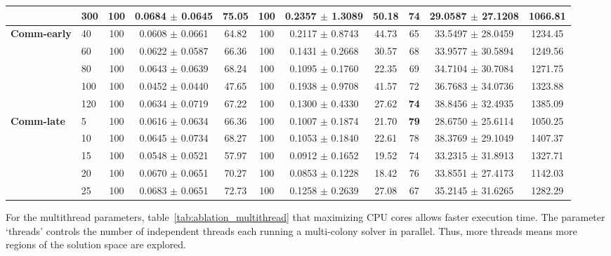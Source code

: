 \begin{table}[H]
{\begin{tabular}{@{}llccc ccc ccc@{}}
        & 300 & 100 & 0.0684 $\pm$ 0.0645 & 75.05 & 100 & 0.2357 $\pm$ 1.3089 & 50.18 & 74 & 29.0587 $\pm$ 27.1208 & 1066.81 \\
        \midrule
        \multirow{5}{*}{\textbf{Comm-early}} 
        & 40  & 100 & 0.0608 $\pm$ 0.0661 & 64.82 & 100 & 0.2117 $\pm$ 0.8743 & 44.73 & 65 & 33.5497 $\pm$ 28.0459 & 1234.45 \\
        & 60  & 100 & 0.0622 $\pm$ 0.0587 & 66.36 & 100 & 0.1431 $\pm$ 0.2668 & 30.57 & 68 & 33.9577 $\pm$ 30.5894 & 1249.56 \\
        & 80  & 100 & 0.0643 $\pm$ 0.0639 & 68.24 & 100 & 0.1095 $\pm$ 0.1760 & 22.35 & 69 & 34.7104 $\pm$ 30.7084 & 1271.75 \\
        & 100 & 100 & 0.0452 $\pm$ 0.0440 & 47.65 & 100 & 0.1938 $\pm$ 0.9708 & 41.57 & 72 & 36.7683 $\pm$ 34.0736 & 1323.88 \\
        & 120 & 100 & 0.0634 $\pm$ 0.0719 & 67.22 & 100 & 0.1300 $\pm$ 0.4330 & 27.62 & \textbf{74} & 38.8456 $\pm$ 32.4935 & 1385.09 \\
        \midrule
        \multirow{5}{*}{\textbf{Comm-late}} 
        & 5   & 100 & 0.0616 $\pm$ 0.0634 & 66.36 & 100 & 0.1007 $\pm$ 0.1874 & 21.70 & \textbf{79} & 28.6750 $\pm$ 25.6114 & 1050.25 \\
        & 10  & 100 & 0.0645 $\pm$ 0.0734 & 68.27 & 100 & 0.1053 $\pm$ 0.1840 & 22.61 & 78 & 38.3769 $\pm$ 29.1049 & 1407.37 \\
        & 15  & 100 & 0.0548 $\pm$ 0.0521 & 57.97 & 100 & 0.0912 $\pm$ 0.1652 & 19.52 & 74 & 33.2315 $\pm$ 31.8913 & 1327.71 \\
        & 20  & 100 & 0.0670 $\pm$ 0.0651 & 70.27 & 100 & 0.0853 $\pm$ 0.1228 & 18.42 & 76 & 33.8551 $\pm$ 27.4173 & 1142.03 \\
        & 25  & 100 & 0.0683 $\pm$ 0.0651 & 72.73 & 100 & 0.1258 $\pm$ 0.2639 & 27.08 & 67 & 35.2145 $\pm$ 31.6265 & 1282.29 \\
        \bottomrule
    \end{tabular}}
\end{table}

For the multithread parameters, table~\ref{tab:ablation_multithread} that maximizing CPU cores allows faster execution time. The parameter `threads' controls the number of independent threads each running a multi-colony solver in parallel. Thus, more threads means more regions of the solution space are explored.

